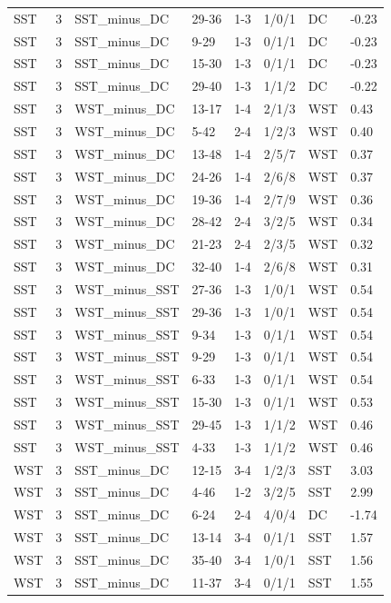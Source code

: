 \begin{table}[!h]
\begin{tabular}[t]{lrllllll}
\addlinespace
SST & 3 & SST_minus_DC & 29-36 & 1-3 & 1/0/1 & DC & -0.23\\
SST & 3 & SST_minus_DC & 9-29 & 1-3 & 0/1/1 & DC & -0.23\\
SST & 3 & SST_minus_DC & 15-30 & 1-3 & 0/1/1 & DC & -0.23\\
SST & 3 & SST_minus_DC & 29-40 & 1-3 & 1/1/2 & DC & -0.22\\
SST & 3 & WST_minus_DC & 13-17 & 1-4 & 2/1/3 & WST & 0.43\\
\addlinespace
SST & 3 & WST_minus_DC & 5-42 & 2-4 & 1/2/3 & WST & 0.40\\
SST & 3 & WST_minus_DC & 13-48 & 1-4 & 2/5/7 & WST & 0.37\\
SST & 3 & WST_minus_DC & 24-26 & 1-4 & 2/6/8 & WST & 0.37\\
SST & 3 & WST_minus_DC & 19-36 & 1-4 & 2/7/9 & WST & 0.36\\
SST & 3 & WST_minus_DC & 28-42 & 2-4 & 3/2/5 & WST & 0.34\\
\addlinespace
SST & 3 & WST_minus_DC & 21-23 & 2-4 & 2/3/5 & WST & 0.32\\
SST & 3 & WST_minus_DC & 32-40 & 1-4 & 2/6/8 & WST & 0.31\\
SST & 3 & WST_minus_SST & 27-36 & 1-3 & 1/0/1 & WST & 0.54\\
SST & 3 & WST_minus_SST & 29-36 & 1-3 & 1/0/1 & WST & 0.54\\
SST & 3 & WST_minus_SST & 9-34 & 1-3 & 0/1/1 & WST & 0.54\\
\addlinespace
SST & 3 & WST_minus_SST & 9-29 & 1-3 & 0/1/1 & WST & 0.54\\
SST & 3 & WST_minus_SST & 6-33 & 1-3 & 0/1/1 & WST & 0.54\\
SST & 3 & WST_minus_SST & 15-30 & 1-3 & 0/1/1 & WST & 0.53\\
SST & 3 & WST_minus_SST & 29-45 & 1-3 & 1/1/2 & WST & 0.46\\
SST & 3 & WST_minus_SST & 4-33 & 1-3 & 1/1/2 & WST & 0.46\\
\addlinespace
WST & 3 & SST_minus_DC & 12-15 & 3-4 & 1/2/3 & SST & 3.03\\
WST & 3 & SST_minus_DC & 4-46 & 1-2 & 3/2/5 & SST & 2.99\\
WST & 3 & SST_minus_DC & 6-24 & 2-4 & 4/0/4 & DC & -1.74\\
WST & 3 & SST_minus_DC & 13-14 & 3-4 & 0/1/1 & SST & 1.57\\
WST & 3 & SST_minus_DC & 35-40 & 3-4 & 1/0/1 & SST & 1.56\\
\addlinespace
WST & 3 & SST_minus_DC & 11-37 & 3-4 & 0/1/1 & SST & 1.55\\

\end{tabular}
\end{table}

